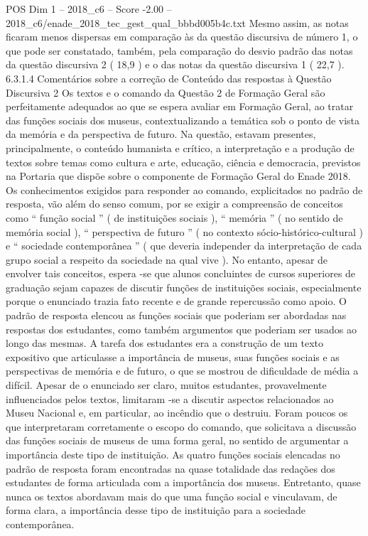 \begin{textsample}{POS Dim 1 – 2018\_c6 – Score -2.00 – 2018\_c6/enade\_2018\_tec\_gest\_qual\_bbbd005b4c.txt}
Mesmo assim, as notas ficaram menos dispersas em comparação às da questão discursiva de número 1, o que pode ser constatado, também, pela comparação do desvio padrão das notas da questão discursiva 2 ( 18,9 ) e o das notas da questão discursiva 1 ( 22,7 ). 6.3.1.4 Comentários sobre a correção de Conteúdo das respostas à Questão Discursiva 2 Os textos e o comando da Questão 2 de Formação Geral são perfeitamente adequados ao que se espera avaliar em Formação Geral, ao tratar das funções sociais dos museus, contextualizando a temática sob o ponto de vista da memória e da perspectiva de futuro.
Na questão, estavam presentes, principalmente, o conteúdo humanista e crítico, a interpretação e a produção de textos sobre temas como cultura e arte, educação, ciência e democracia, previstos na Portaria que dispõe sobre o componente de Formação Geral do Enade 2018.
Os conhecimentos exigidos para responder ao comando, explicitados no padrão de resposta, vão além do senso comum, por se exigir a compreensão de conceitos como “ função social ” ( de instituições sociais ), “ memória ” ( no sentido de memória social ), “ perspectiva de futuro ” ( no contexto sócio-histórico-cultural ) e “ sociedade contemporânea ” ( que deveria independer da interpretação de cada grupo social a respeito da sociedade na qual vive ).
No entanto, apesar de envolver tais conceitos, espera -se que alunos concluintes de cursos superiores de graduação sejam capazes de discutir funções de instituições sociais, especialmente porque o enunciado trazia fato recente e de grande repercussão como apoio.
O padrão de resposta elencou as funções sociais que poderiam ser abordadas nas respostas dos estudantes, como também argumentos que poderiam ser usados ao longo das mesmas.
A tarefa dos estudantes era a construção de um texto expositivo que articulasse a importância de museus, suas funções sociais e as perspectivas de memória e de futuro, o que se mostrou de dificuldade de média a difícil.
Apesar de o enunciado ser claro, muitos estudantes, provavelmente influenciados pelos textos, limitaram -se a discutir aspectos relacionados ao Museu Nacional e, em particular, ao incêndio que o destruiu.
Foram poucos os que interpretaram corretamente o escopo do comando, que solicitava a discussão das funções sociais de museus de uma forma geral, no sentido de argumentar a importância deste tipo de instituição.
As quatro funções sociais elencadas no padrão de resposta foram encontradas na quase totalidade das redações dos estudantes de forma articulada com a importância dos museus.
Entretanto, quase nunca os textos abordavam mais do que uma função social e vinculavam, de forma clara, a importância desse tipo de instituição para a sociedade contemporânea.

\end{textsample}

